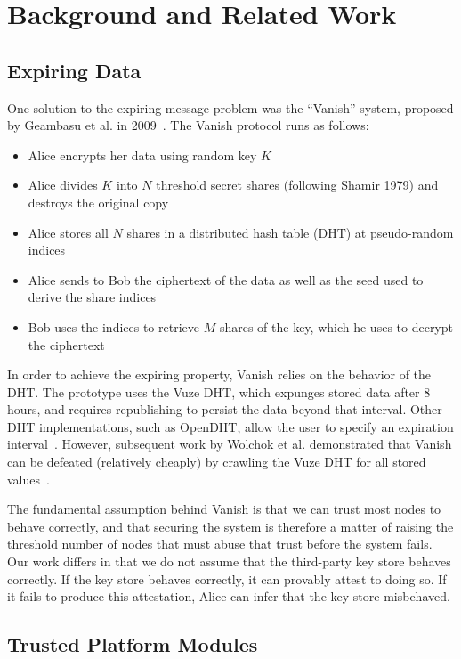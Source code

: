 \documentclass{article}
\begin{document}
\section{Background and Related Work}

\subsection{Expiring Data}

One solution to the expiring message problem was the ``Vanish'' system, proposed by Geambasu et al. in 2009~\cite{vanish}. The Vanish protocol runs as follows:

\begin{itemize}
\item Alice encrypts her data using random key $K$
\item Alice divides $K$ into $N$ threshold secret shares (following Shamir 1979) and destroys the original copy
\item Alice stores all $N$ shares in a distributed hash table (DHT) at pseudo-random indices
\item Alice sends to Bob the ciphertext of the data as well as the seed used to derive the share indices
\item Bob uses the indices to retrieve $M$ shares of the key, which he uses to decrypt the ciphertext
\end{itemize}

In order to achieve the expiring property, Vanish relies on the behavior of the DHT. The prototype uses the Vuze DHT, which expunges stored data after 8 hours, and requires republishing to persist the data beyond that interval. Other DHT implementations, such as OpenDHT, allow the user to specify an expiration interval~\cite{vanish}. However, subsequent work by Wolchok et al. demonstrated that Vanish can be defeated (relatively cheaply) by crawling the Vuze DHT for all stored values~\cite{defeat-vanish}.

The fundamental assumption behind Vanish is that we can trust most nodes to behave correctly, and that securing the system is therefore a matter of raising the threshold number of nodes that must abuse that trust before the system fails. Our work differs in that we do not assume that the third-party key store behaves correctly. If the key store behaves correctly, it can provably attest to doing so. If it fails to produce this attestation, Alice can infer that the key store misbehaved.

\subsection{Trusted Platform Modules}
\end{document}
